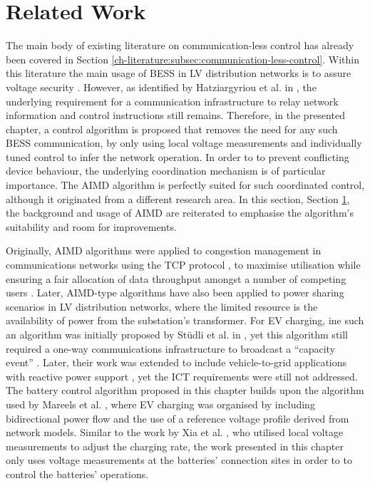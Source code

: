 \section{Related Work}
\label{ch4:sec:related-work}

The main body of existing literature on communication-less control has already been covered in Section \ref{ch-literature:subsec:communication-less-control}.
Within this literature the main usage of BESS in LV distribution networks is to assure voltage security \cite{Sugihara2013, Toledo2013, Marra2013, Mokhtari2013, Atia2016}.
However, as identified by Hatziargyriou et al. in \cite{Hatziargyriou2015}, the underlying requirement for a communication infrastructure to relay network information and control instructions still remains.
Therefore, in the presented chapter, a control algorithm is proposed that removes the need for any such BESS communication, by only using local voltage measurements and individually tuned control to infer the network operation.
In order to to prevent conflicting device behaviour, the underlying coordination mechanism is of particular importance.
The AIMD algorithm is perfectly suited for such coordinated control, although it originated from a different research area.
In this section, Section \ref{ch4:sec:related-work}, the background and usage of AIMD are reiterated to emphasise the algorithm's suitability and room for improvements.

Originally, AIMD algorithms were applied to congestion management in communications networks using the TCP protocol \cite{Chiu1989}, to maximise utilisation while ensuring a fair allocation of data throughput amongst a number of competing users \cite{Wirth2014}.
Later, AIMD-type algorithms have also been applied to power sharing scenarios in LV distribution networks, where the limited resource is the availability of power from the substation's transformer.
For EV charging, ine such an algorithm was initially proposed by St{\"{u}}dli et al. in \cite{Studli2012}, yet this algorithm still required a one-way communications infrastructure to broadcast a ``capacity event'' \cite{Studli2014, Studli2014a}.
Later, their work was extended to include vehicle-to-grid applications with reactive power support \cite {Studli2015}, yet the ICT requirements were still not addressed.
The battery control algorithm proposed in this chapter builds upon the algorithm used by Mareels et al. \cite{Mareels2014}, where EV charging was organised by including bidirectional power flow and the use of a reference voltage profile derived from network models.
Similar to the work by Xia et al. \cite{Xia2014}, who utilised local voltage measurements to adjust the charging rate, the work presented in this chapter only uses voltage measurements at the batteries' connection sites in order to to control the batteries' operations.

